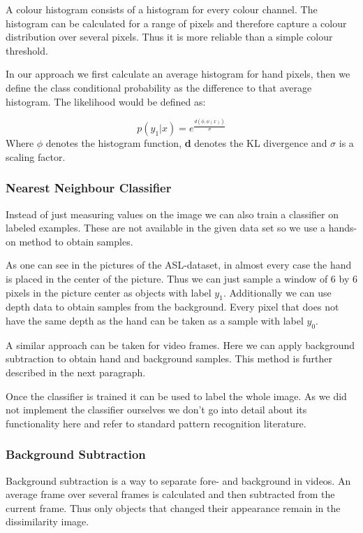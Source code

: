 \documentclass[letterpaper, 10 pt, conference]{ieeeconf}  %
\begin{document}
A colour histogram consists of a histogram for every colour channel. The histogram can be calculated for a range of pixels and therefore capture a colour distribution over several pixels. Thus it is more reliable than a simple colour threshold.

In our approach we first calculate an average histogram for hand pixels, then we define the class conditional probability as the difference to that average histogram. The likelihood would be defined as:

\begin{equation}
p(y_1 | x) = e^{\frac{d(\bar{\phi},\phi(x))}{\sigma}}
\end{equation}
Where $\phi$ denotes the histogram function, \textbf{d} denotes the KL divergence and $\sigma$ is a scaling factor.

\subsubsection{Nearest Neighbour Classifier}

Instead of just measuring values on the image we can also train a classifier on labeled examples. These are not available in the given data set so we use a hands-on method to obtain samples.

As one can see in the pictures of the ASL-dataset, in almost every case the hand is placed in the center of the picture. Thus we can just sample a window of 6 by 6 pixels in the picture center as objects with label $y_1$. Additionally we can use depth data to obtain samples from the background. Every pixel that does not have the same depth as the hand can be taken as a sample with label $y_0$.

A similar approach can be taken for video frames. Here we can apply background subtraction to obtain hand and background samples. This method is further described in the next paragraph.

Once the classifier is trained it can be used to label the whole image. As we did not implement the classifier ourselves we don't go into detail about its functionality here and refer to standard pattern recognition literature.

\subsubsection{Background Subtraction}

Background subtraction is a way to separate fore- and background in videos. An average frame over several frames is calculated and then subtracted from the current frame. Thus only objects that changed their appearance remain in the dissimilarity image.
\end{document}
